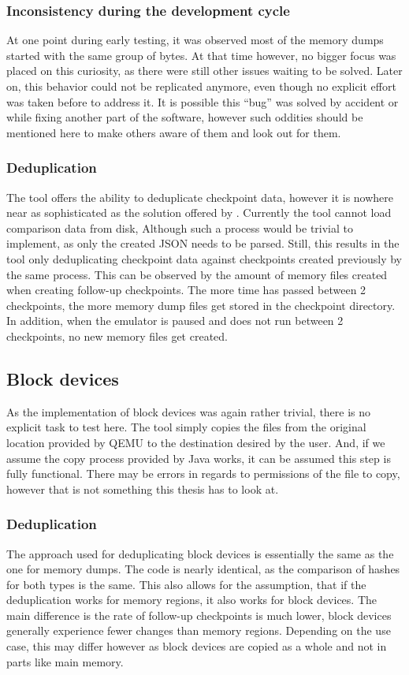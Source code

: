 \subsubsection*{Inconsistency during the development cycle}
At one point during early testing,
it was observed most of the memory dumps started with the same group of bytes.
At that time however, no bigger focus was placed on this curiosity,
as there were still other issues waiting to be solved.
Later on, this behavior could not be replicated anymore,
even though no explicit effort was taken before to address it.
It is possible this \enquote{bug} was solved by accident
or while fixing another part of the software,
however such oddities should be mentioned here to make others aware of them and look out for them.

\subsubsection*{Deduplication}
The tool offers the ability to deduplicate checkpoint data,
however it is nowhere near as sophisticated as the solution offered by \citeauthor{kitcheckpoints}.
Currently the tool cannot load comparison data from disk,
Although such a process would be trivial to implement,
as only the created JSON needs to be parsed.
Still, this results in the tool only deduplicating checkpoint data
against checkpoints created previously by the same process.
This can be observed by the amount of memory files created
when creating follow-up checkpoints.
The more time has passed between 2 checkpoints,
the more memory dump files get stored in the checkpoint directory.
In addition, when the emulator is paused and does not run between 2 checkpoints, no new memory files get created.

\subsection{Block devices}
As the implementation of block devices was again rather trivial,
there is no explicit task to test here.
The tool simply copies the files from the original location provided by QEMU
to the destination desired by the user.
And, if we assume the copy process provided by Java works,
it can be assumed this step is fully functional.
There may be errors in regards to permissions of the file to copy,
however that is not something this thesis has to look at.

\subsubsection*{Deduplication}
The approach used for deduplicating block devices is essentially the same as the one for memory dumps.
The code is nearly identical, as the comparison of hashes for both types is the same.
This also allows for the assumption, that if the deduplication works for memory regions,
it also works for block devices.
The main difference is the rate of follow-up checkpoints is much lower,
block devices generally experience fewer changes than memory regions.
Depending on the use case, this may differ however as block devices are copied as a whole and not in parts like main memory.

